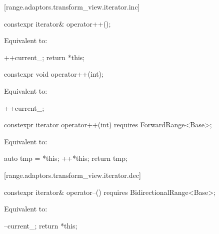 [range.adaptors.transform_view.iterator.inc]{}

\begin{itemdecl}
constexpr iterator& operator++();
\end{itemdecl}

\begin{itemdescr}
\pnum
\effects Equivalent to:
\begin{codeblock}
++current_;
return *this;
\end{codeblock}
\end{itemdescr}

\begin{itemdecl}
constexpr void operator++(int);
\end{itemdecl}

\begin{itemdescr}
\pnum
\effects Equivalent to:
\begin{codeblock}
++current_;
\end{codeblock}
\end{itemdescr}

\begin{itemdecl}
constexpr iterator operator++(int) requires ForwardRange<Base>;
\end{itemdecl}

\begin{itemdescr}
\pnum
\effects Equivalent to:
\begin{codeblock}
auto tmp = *this;
++*this;
return tmp;
\end{codeblock}
\end{itemdescr}

[range.adaptors.transform_view.iterator.dec]{}

\begin{itemdecl}
constexpr iterator& operator--() requires BidirectionalRange<Base>;
\end{itemdecl}

\begin{itemdescr}
\pnum
\effects Equivalent to:
\begin{codeblock}
--current_;
return *this;
\end{codeblock}
\end{itemdescr}

